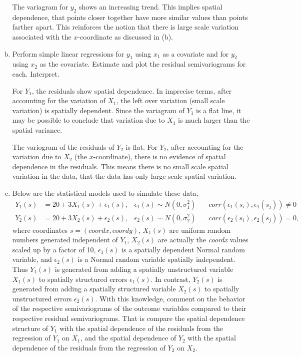\documentclass[letterpaper, 12pt]{article}
\begin{document}
\begin{enumerate}[(a)]
{The variagram for $y_2$ shows an increasing trend. This implies spatial dependence, that points closer together have more similar values than points farther apart. This reinforces the notion that there is large scale variation associated with the $x$-coordinate as discussed in (b).}

\item
Perform simple linear regressions for $y_1$ using $x_1$ as a covariate and for $y_2$ using $x_2$ as the covariate. Estimate and plot the residual semivariograms for each. Interpret.


{\sf
For $Y_1$, the residuals show spatial dependence. In imprecise terms, after accounting for the variation of $X_1$, the left over variation (small scale variation) is spatially dependent. Since the variagram of $Y_1$ is a flat line, it may be possible to conclude that variation due to $X_1$ is much larger than the spatial variance.

The variogram of the residuals of $Y_2$ is flat. For $Y_2$, after accounting for the variation due to $X_2$ (the $x$-coordinate), there is no evidence of spatial dependence in the residuals. This means there is no small scale spatial variation in the data, that the data has only large scale spatial variation.
}


\item
Below are the statistical models used to simulate these data,
\begin{align*}
Y_1(s) 
&= 20+3X_1(s)+\epsilon_1(s), 
&\epsilon_1(s)\sim N(0,\sigma_1^2) 
\quad
& corr(\epsilon_1(s_i),\epsilon_1(s_j)) \neq 0
\\
Y_2(s) 
&= 20+3X_2(s)+\epsilon_2(s), 
&\epsilon_2(s)\sim N(0,\sigma_2^2) 
\quad
& corr(\epsilon_2(s_i),\epsilon_2(s_j)) = 0,
\end{align*}
where coordinates $s = (coordx, coordy)$, $X_1(s)$ are uniform random numbers generated independent of $Y_1$, $X_2(s)$ are actually the \textit{coordx} values scaled up by a factor of 10, $\epsilon_1(s)$ is a spatially dependent Normal random variable, and $\epsilon_2(s)$ is a Normal random variable spatially independent. Thus $Y_1(s)$ is generated from adding a spatially unstructured variable $X_1(s)$ to spatially structured errors $\epsilon_1(s)$. In contrast, $Y_2(s)$ is generated from adding a spatially structured variable $X_2(s)$ to spatially unstructured errors $\epsilon_2(s)$. With this knowledge, comment on the behavior of the respective semivariograms of the outcome variables compared to their respective residual semivariograms. That is compare the spatial dependence structure of $Y_1$ with the spatial dependence of the residuals from the regression of $Y_1$ on $X_1$, and the spatial dependence of $Y_2$ with the spatial dependence of the residuals from the regression of $Y_2$ on $X_2$.


\end{enumerate}
\end{document}
